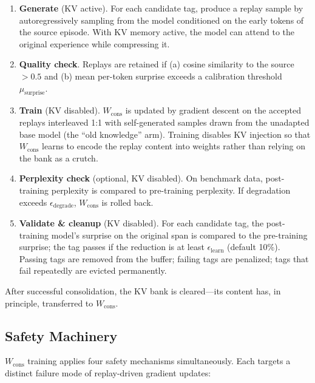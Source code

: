 \begin{enumerate}[itemsep=0.15em,topsep=0.2em]
    \item \textbf{Generate} (KV active). For each candidate tag, produce a replay sample by autoregressively sampling from the model conditioned on the early tokens of the source episode. With KV memory active, the model can attend to the original experience while compressing it.
    \item \textbf{Quality check}. Replays are retained if (a) cosine similarity to the source $> 0.5$ and (b) mean per-token surprise exceeds a calibration threshold $\mu_{\mathrm{surprise}}$.
    \item \textbf{Train} (KV disabled). $W_{\mathrm{cons}}$ is updated by gradient descent on the accepted replays interleaved 1:1 with self-generated samples drawn from the unadapted base model (the ``old knowledge'' arm). Training disables KV injection so that $W_{\mathrm{cons}}$ learns to encode the replay content into weights rather than relying on the bank as a crutch.
    \item \textbf{Perplexity check} (optional, KV disabled). On benchmark data, post-training perplexity is compared to pre-training perplexity. If degradation exceeds $\epsilon_{\mathrm{degrade}}$, $W_{\mathrm{cons}}$ is rolled back.
    \item \textbf{Validate \& cleanup} (KV disabled). For each candidate tag, the post-training model's surprise on the original span is compared to the pre-training surprise; the tag passes if the reduction is at least $\epsilon_{\mathrm{learn}}$ (default 10\%). Passing tags are removed from the buffer; failing tags are penalized; tags that fail repeatedly are evicted permanently.
\end{enumerate}

After successful consolidation, the KV bank is cleared---its content has, in principle, transferred to $W_{\mathrm{cons}}$.

\subsection{Safety Machinery}
\label{sec:safety}

$W_{\mathrm{cons}}$ training applies four safety mechanisms simultaneously. Each targets a distinct failure mode of replay-driven gradient updates:

